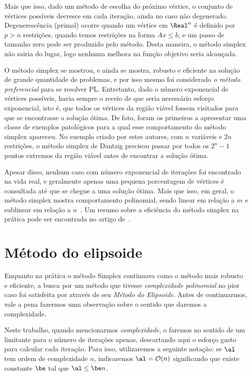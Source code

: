 Mais que isso, dado um método de escolha do próximo vértice, o conjunto de
vértices possíveis decresce em cada iteração,  ainda no caso não degenerado.
Degenerescência (primal) ocorre quando um vértice em $\Real^n$ é definido por
$p>n$ restrições, quando temos restrições na forma $Ax\leq b$, e um passo de tamanho zero pode ser produzido pelo método. Desta
maneira, o método simplex não sairia do lugar, logo nenhuma melhora na função
objetivo seria alcançada. 


O método simplex se mostrou, e ainda se mostra, robusto e eficiente na solução de grande
quantidade de problemas, e por isso mesmo foi considerado \emph{o método
preferencial} para se resolver \ac{PL}. Entretanto, dado o número exponencial
de  vértices possíveis, havia sempre o receio de que seria necessário esforço
exponencial, isto é, que   todos os vértices da região viável fossem
visitados para que se encontrasse a solução ótima. De fato, \textcite{Klee:1972wi}
foram os primeiros a apresentar uma classe de exemplos patológicos para a qual esse
comportamento  do método simplex apareceu. No exemplo criado por estes
autores, com $n$ variáveis e $2n$ restrições, o método simplex de Dantzig 
precisou passar por todos os $2^n-1$ pontos extremos da região viável antes de
encontrar a solução ótima. 


Apesar disso, nenhum caso com número exponencial de iterações foi encontrado na
vida real, e geralmente apenas uma pequena porcentagem de vértices é
consultada até que se chegue a uma solução ótima. Mais que isso, em geral, o método
simplex mostra comportamento polinomial, sendo linear em relação a $m$ e
sublinear em relação a $n$~\cite[pg.~94]{Fang:1993wu}. Um resumo sobre a
eficiência do método simplex na prática pode ser encontrada no artigo
de~\textcite{Shamir:1987th}.
 

\section{Método do elipsoide}

Enquanto na prática o método Simplex continuava como o método mais robusto e
eficiente, a busca por um método que tivesse \emph{complexidade polinomial} no pior
caso foi satisfeita por \textcite{Khachiyan:A-polynomial-algorithm:1979y} através
de seu  \emph{Método do Elipsoide}. Antes de continuarmos, vale a pena fazermos uma observação sobre o sentido que daremos a complexidade.

\begin{obs}
Neste trabalho, quando mencionarmos \emph{complexidade}, o faremos no sentido de um limitante para o número de iterações apenas, descartando aqui o esforço gasto para calcular cada iteração.
Para isso, utilizaremos a seguinte notação: se $\al$ tem ordem de complexidade $n$, indicaremos $\al = \Oset(n)$ significando que  existe constante $\be$ tal que $\al \leq \be n$.
\end{obs}

